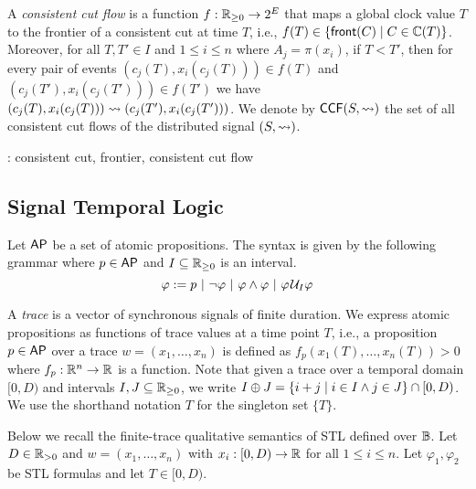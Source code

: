 A \emph{consistent cut flow} is a function $f : \mathbb{R}_{\geq 0} \to 2^E$ that maps a global clock value $T$ to the frontier of a consistent cut at time $T$, i.e., $f(T) \in \{\fr(C) \st C \in \CC(T)\}$.
Moreover, for all $T,T' \in I$ and $1 \leq i \leq n$ where $A_j = \pi(x_i)$, if $T < T'$, then for every pair of events $(c_j(T), x_i(c_j(T))) \in f(T)$ and $(c_j(T'), x_i(c_j(T'))) \in f(T')$ we have $(c_j(T), x_i(c_j(T))) \rightsquigarrow (c_j(T'), x_i(c_j(T')))$.
We denote by $\mathsf{CCF}(S,{\rightsquigarrow})$ the set of all consistent cut flows of the distributed signal $(S,{\rightsquigarrow})$.

\begin{example}
	\TODO: consistent cut, frontier, consistent cut flow
\end{example}


\subsection{Signal Temporal Logic} \label{sec:stl}
Let $\mathsf{AP}$ be a set of atomic propositions.
The syntax is given by the following grammar where $p \in \mathsf{AP}$ and $I \subseteq \mathbb{R}_{\geq 0}$ is an interval.
$$ \varphi :=  p ~|~ \lnot \varphi ~|~ \varphi \land \varphi ~|~ \varphi \kern.1em\mathcal{U}_I \varphi$$

A \emph{trace} is a vector of synchronous signals of finite duration.
We express atomic propositions as functions of trace values at a time point $T$, i.e., a proposition $p \in \mathsf{AP}$ over a trace $w = (x_1, \ldots, x_n)$ is defined as $f_p(x_1(T), \ldots, x_n(T)) > 0$ where $f_p : \mathbb{R}^n \to \mathbb{R}$ is a function.
Note that given a trace over a temporal domain $[0,D)$ and intervals $I,J \subseteq \mathbb{R}_{\geq 0}$, we write $I \oplus J = \{i + j \st i \in I \land j \in J\} \cap [0,D)$.
We use the shorthand notation $T$ for the singleton set $\{T\}$.

Below we recall the finite-trace qualitative semantics of STL defined over $\mathbb{B}$.
Let $D \in \mathbb{R}_{> 0}$ and $w = (x_1, \ldots, x_n)$ with $x_i : [0,D) \to \mathbb{R}$ for all $1 \leq i \leq n$.
Let $\varphi_1, \varphi_2$ be STL formulas and let $T \in [0,D)$.

